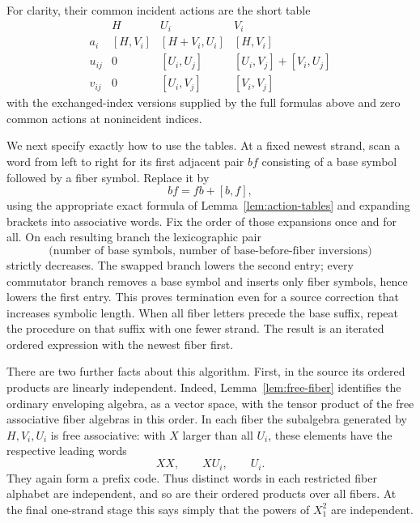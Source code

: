 For clarity, their common incident actions are the short table
\begin{equation}\label{eq:common-actions}
\begin{array}{c|ccc}
 &H&U_i&V_i\\ \hline
 a_i &[H,V_i]&[H+V_i,U_i]&[H,V_i]\\
 u_{ij}&0&[U_i,U_j]&[U_i,V_j]+[V_i,U_j]\\
 v_{ij}&0&[U_i,V_j]&[V_i,V_j]
\end{array}
\end{equation}
with the exchanged-index versions supplied by the full formulas
above and zero common actions at nonincident indices.

We next specify exactly how to use the tables.  At a fixed newest
strand, scan a word from left to right for its first adjacent pair
$bf$ consisting of a base symbol followed by a fiber symbol.  Replace
it by
\begin{equation}\label{eq:ordering-swap}
 bf=fb+[b,f],
\end{equation}
using the appropriate exact formula of
Lemma~\ref{lem:action-tables} and expanding brackets into associative
words.  Fix the order of those expansions once and for all.
On each resulting branch the lexicographic pair
\[
 \bigl(\text{number of base symbols},\,
        \text{number of base-before-fiber inversions}\bigr)
\]
strictly decreases.  The swapped branch lowers the second entry;
every commutator branch removes a base symbol and inserts only fiber
symbols, hence lowers the first entry.  This proves termination even
for a source correction that increases symbolic length.  When all
fiber letters precede the base suffix, repeat the procedure on that
suffix with one fewer strand.  The result is an iterated ordered
expression with the newest fiber first.

There are two further facts about this algorithm.  First, in the
source its ordered products are linearly independent.  Indeed,
Lemma~\ref{lem:free-fiber} identifies the ordinary enveloping algebra,
as a vector space, with the tensor product of the free associative
fiber algebras in this order.  In each fiber the subalgebra generated
by $H,V_i,U_i$ is free associative: with $X$ larger than all $U_i$,
these elements have the respective leading words
\[
 XX,\qquad XU_i,\qquad U_i.
\]
They again form a prefix code.  Thus distinct words in each restricted
fiber alphabet are independent, and so are their ordered products
over all fibers.  At the final one-strand stage this says simply
that the powers of $X_1^2$ are independent.

